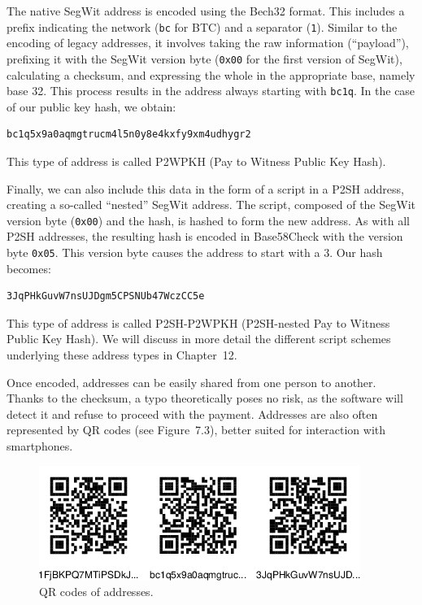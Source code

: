 \documentclass[
  a5paper,
  smalldemyvopaper,10pt,twoside,onecolumn,openright,extrafontsizes,hidelinks]{memoir}
\begin{document}
The native SegWit address is encoded using the Bech32 format. This
includes a prefix indicating the network (\texttt{bc} for BTC) and a
separator (\texttt{1}). Similar to the encoding of legacy addresses, it
involves taking the raw information (``payload''), prefixing it with the
SegWit version byte (\texttt{0x00} for the first version of SegWit),
calculating a checksum, and expressing the whole in the appropriate
base, namely base 32. This process results in the address always
starting with \texttt{bc1q}. In the case of our public key hash, we
obtain:

\begin{verbatim}
bc1q5x9a0aqmgtrucm4l5n0y8e4kxfy9xm4udhygr2
\end{verbatim}

This type of address is called P2WPKH (Pay to Witness Public Key Hash).

Finally, we can also include this data in the form of a script in a P2SH
address, creating a so-called ``nested'' SegWit address. The script,
composed of the SegWit version byte (\texttt{0x00}) and the hash, is
hashed to form the new address. As with all P2SH addresses, the
resulting hash is encoded in Base58Check with the version byte
\texttt{0x05}. This version byte causes the address to start with a 3.
Our hash becomes:

\begin{verbatim}
3JqPHkGuvW7nsUJDgm5CPSNUb47WczCC5e
\end{verbatim}

This type of address is called P2SH-P2WPKH (P2SH-nested Pay to Witness
Public Key Hash). We will discuss in more detail the different script
schemes underlying these address types in Chapter~12.

Once encoded, addresses can be easily shared from one person to another.
Thanks to the checksum, a typo theoretically poses no risk, as the
software will detect it and refuse to proceed with the payment.
Addresses are also often represented by QR codes (see Figure~7.3),
better suited for interaction with smartphones.

\begin{figure}

{\centering \includegraphics{chapters/img/address-qr-codes.png}

}

\caption{QR codes of addresses.}

\end{figure}%
\end{document}
